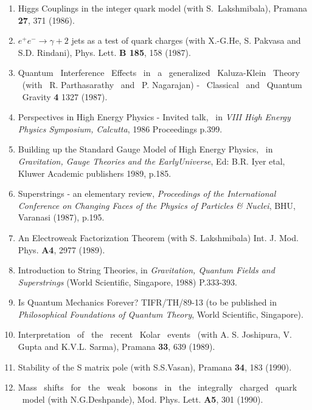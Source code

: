 \begin{enumerate}
\item Higgs Couplings in the integer quark model (with S.\ Lakshmi\-bala), 
Pramana {\bf 27}, 371 (1986).

\item $e^+e^- \rightarrow \gamma + 2$ jets as a test of quark charges
(with X.-G.He, S. Pakvasa and S.D. Rindani), Phys. Lett. {\bf B 185}, 
158 (1987).

\item Quantum \ Interference \ Effects \ in \ a \ generalized \ Kaluza-Klein \
Theory
\ (with \ R. Parthasarathy \ and \ P. Nagarajan) - \ Classical \ and \ Quantum \ Gravity
{\bf 4} 1327 (1987).

\item Perspectives in High Energy Physics - Invited talk, \ in {\it VIII High
Energy Physics Symposium, Calcutta}, 1986 Procee\-dings p.399.

\item Building up the Standard Gauge Model of High Energy Physics, \ in
{\it Gravitation, Gauge Theories and the Early\break Universe}, Ed: B.R. Iyer etal, 
Kluwer Academic publishers 1989, p.185.

\item Superstrings - an elementary review, {\it Proceedings of the
Internatio\-nal Conference on Changing Faces of the Physics of Particles \&
Nuclei}, BHU, Varanasi (1987), p.195.

\item An Electroweak Factorization Theorem (with S. Lakshmi\-bala)
Int. J. Mod. Phys. {\bf A4}, 2977 (1989).

\item Introduction to String Theories, in {\it Gravitation, Quantum
Fields and Superstrings} (World Scientific, Singapore, 1988) P.333-393.

\item Is Quantum Mechanics Forever? TIFR/TH/89-13 (to be published
in {\it Philosophical Foundations of Quantum Theory}, World Scientific, 
Singapore).

\item Interpretation \ of \ the \ recent \ Kolar \ events \ (with
A. S. Joshipura, V. Gupta and K.V.L. Sarma), Pramana {\bf 33}, 639 (1989).

\item Stability of the S matrix pole (with S.S.Vasan), Pramana {\bf
34}, 183 (1990).

\item Mass \ shifts \ for \ the \ weak \ bosons \ in \ the \ integrally \
charged
\ quark \ model (with N.G.Deshpande), Mod. Phys. Lett. {\bf A5}, 301 (1990).


\end{enumerate}
